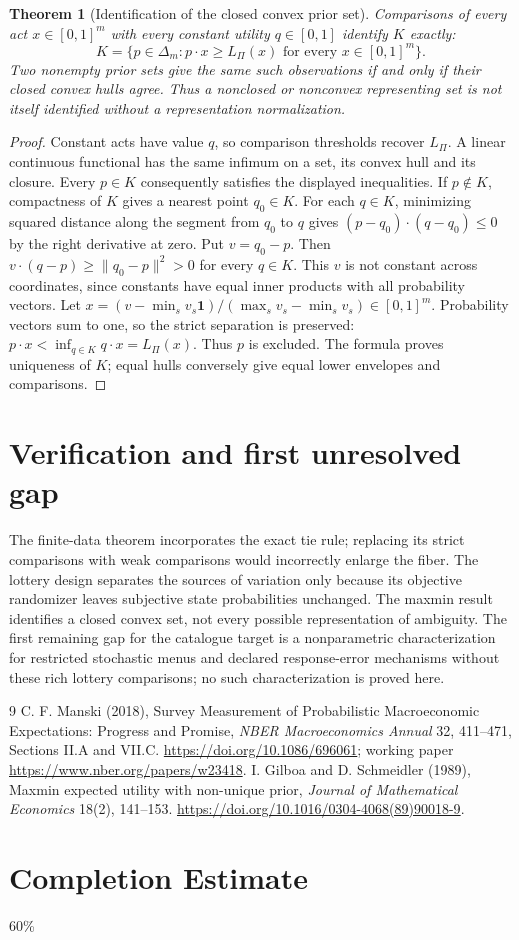\documentclass[11pt]{article}
\newtheorem{theorem}{Theorem}
\theoremstyle{remark}
\begin{document}
\begin{theorem}[Identification of the closed convex prior set]
Comparisons of every act $x\in[0,1]^m$ with every constant utility
$q\in[0,1]$ identify $K$ exactly:
\[
 K=\{p\in\Delta_m:p\cdot x\geq L_\Pi(x)
                        \text{ for every }x\in[0,1]^m\}.
\]
Two nonempty prior sets give the same such observations if and only if
their closed convex hulls agree. Thus a nonclosed or nonconvex representing
set is not itself identified without a representation normalization.
\end{theorem}
\begin{proof}
Constant acts have value $q$, so comparison thresholds recover $L_\Pi$.
A linear continuous functional has the same infimum on a set, its convex
hull and its closure. Every $p\in K$ consequently satisfies the displayed
inequalities. If $p\notin K$, compactness of $K$ gives a nearest point
$q_0\in K$. For each $q\in K$, minimizing squared distance along the segment
from $q_0$ to $q$ gives
$(p-q_0)\cdot(q-q_0)\leq0$ by the right derivative at zero.
Put $v=q_0-p$. Then
$v\cdot(q-p)\geq\|q_0-p\|^2>0$ for every $q\in K$.
This $v$ is not constant across coordinates, since constants have equal
inner products with all probability vectors. Let
$x=(v-\min_s v_s\mathbf 1)/(\max_s v_s-\min_s v_s)\in[0,1]^m$.
Probability vectors sum to one, so the strict separation is preserved:
$p\cdot x<\inf_{q\in K}q\cdot x=L_\Pi(x)$. Thus $p$ is excluded.
The formula proves uniqueness of $K$; equal hulls conversely give equal
lower envelopes and comparisons.
\end{proof}

\section{Verification and first unresolved gap}
The finite-data theorem incorporates the exact tie rule; replacing its
strict comparisons with weak comparisons would incorrectly enlarge the
fiber. The lottery design separates the sources of variation only because
its objective randomizer leaves subjective state probabilities unchanged.
The maxmin result identifies a closed convex set, not every possible
representation of ambiguity. The first remaining gap for the catalogue
target is a nonparametric characterization for restricted stochastic menus
and declared response-error mechanisms without these rich lottery
comparisons; no such characterization is proved here.

\begin{thebibliography}{9}
 C. F. Manski (2018), Survey Measurement of Probabilistic
Macroeconomic Expectations: Progress and Promise, \emph{NBER Macroeconomics
Annual} 32, 411--471, Sections II.A and VII.C.
\url{https://doi.org/10.1086/696061}; working paper
\url{https://www.nber.org/papers/w23418}.
 I. Gilboa and D. Schmeidler (1989), Maxmin expected utility
with non-unique prior, \emph{Journal of Mathematical Economics} 18(2),
141--153. \url{https://doi.org/10.1016/0304-4068(89)90018-9}.
\end{thebibliography}

\section{Completion Estimate}
60\%
\end{document}
